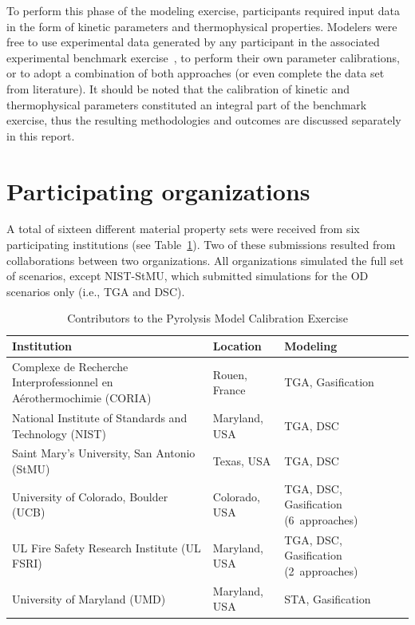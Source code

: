 \documentclass{article}
\begin{document}
To perform this phase of the modeling exercise, participants required input data in the form of kinetic parameters and thermophysical properties. Modelers were free to use experimental data generated by any participant in the associated experimental benchmark exercise~\cite{MaCFP4PyrolysisExp}, to perform their own parameter calibrations, or to adopt a combination of both approaches (or even complete the data set from literature). It should be noted that the calibration of kinetic and thermophysical parameters constituted an integral part of the benchmark exercise, thus the resulting methodologies and outcomes are discussed separately in this report.

\clearpage
\section{Participating organizations}

A total of sixteen different material property sets were received from six participating institutions (see Table~\ref{tab:pyrolysis-conributors}). Two of these submissions resulted from collaborations between two organizations. All organizations simulated the full set of scenarios, except NIST-StMU, which submitted simulations for the OD scenarios only (i.e., TGA and DSC). 


\begin{table}[htbp]
	\centering
	\small
	\caption{Contributors to the Pyrolysis Model Calibration Exercise} \label{tab:pyrolysis-conributors}
	\begin{tabular}{@{}p{7cm}p{4cm}p{4cm}@{}}
				\hline
		\textbf{Institution} & \textbf{Location} & \textbf{Modeling} \\
		\hline
		Complexe de Recherche Interprofessionnel en Aérothermochimie (CORIA)& Rouen, France & TGA, Gasification \\
		National Institute of Standards and Technology (NIST) & Maryland, USA & TGA, DSC\\
		Saint Mary's University, San Antonio (StMU) & Texas, USA & TGA, DSC\\
		University of Colorado, Boulder (UCB) & Colorado, USA & TGA, DSC, Gasification (6~approaches) \\
		UL Fire Safety Research Institute (UL FSRI) & Maryland, USA & TGA, DSC, Gasification (2~approaches) \\
		University of Maryland (UMD) & Maryland, USA & STA, Gasification \\
		
		\hline
	\end{tabular}
	\normalsize
\end{table}
\end{document}

